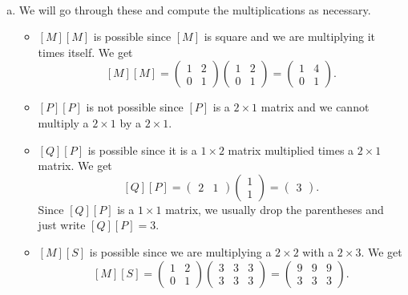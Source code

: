 \documentclass[12pt]{article} %
\begin{document}
\begin{solution}~
    \begin{enumerate}[(a)]
        \item We will go through these and compute the multiplications as necessary.
        \begin{itemize}
            \item $[M][M]$ is possible since $[M]$ is square and we are multiplying it times itself. We get
            \[
            [M] [M] = \begin{pmatrix} 1 & 2\\ 0 & 1 \end{pmatrix} \begin{pmatrix} 1 & 2\\ 0 & 1 \end{pmatrix} = \begin{pmatrix} 1 & 4 \\ 0 & 1 \end{pmatrix}.
            \]
            \item $[P][P]$ is not possible since $[P]$ is a $2\times 1$ matrix and we cannot multiply a $2\times 1$ by a $2\times 1$.
            \item $[Q][P]$ is possible since it is a $1\times 2$ matrix multiplied times a $2 \times 1$ matrix. We get
            \[
                [Q][P] = \begin{pmatrix} 2 & 1 \end{pmatrix} \begin{pmatrix} 1 \\ 1 \end{pmatrix} = \begin{pmatrix} 3 \end{pmatrix}.
            \]
            Since $[Q][P]$ is a $1 \times 1 $ matrix, we usually drop the parentheses and just write $[Q][P] = 3$.
            \item $[M][S]$ is possible since we are multiplying a $2 \times 2$ with a $2 \times 3$. We get
            \[
                [M][S] = \begin{pmatrix} 1 & 2 \\ 0 & 1 \end{pmatrix} \begin{pmatrix} 3 & 3 & 3 \\ 3 & 3 & 3 \end{pmatrix} = \begin{pmatrix} 9 & 9 & 9 \\ 3 & 3 & 3 \end{pmatrix}.
\]
\end{itemize}
\end{enumerate}
\end{solution}
\end{document}
